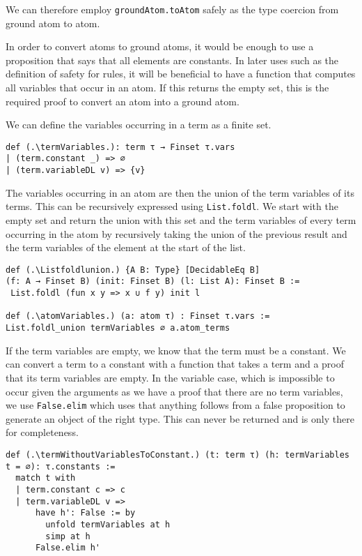 We can therefore employ \lstinline|groundAtom.toAtom| safely as the type coercion from ground atom to atom.

In order to convert atoms to ground atoms, it would be enough to use a proposition that says that all elements are constants. In later uses such as the definition of safety for rules, it will be beneficial to have a function that computes all variables that occur in an atom. If this returns the empty set, this is the required proof to convert an atom into a ground atom. 

We can define the variables occurring in a term as a finite set.

\begin{lstlisting}
def (.\termVariables.): term τ → Finset τ.vars
| (term.constant _) => ∅
| (term.variableDL v) => {v}
\end{lstlisting}

The variables occurring in an atom are then the union of the term variables of its terms. This can be recursively expressed using \lstinline|List.foldl|. We start with the empty set and return the union with this set and the term variables of every term occurring in the atom by recursively taking the union of the previous result and the term variables of the element at the start of the list.

\begin{lstlisting}
def (.\Listfoldlunion.) {A B: Type} [DecidableEq B]  
(f: A → Finset B) (init: Finset B) (l: List A): Finset B :=
 List.foldl (fun x y => x ∪ f y) init l

def (.\atomVariables.) (a: atom τ) : Finset τ.vars := 
List.foldl_union termVariables ∅ a.atom_terms
\end{lstlisting}

If the term variables are empty, we know that the term must be a constant. We can convert a term to a constant with a function that takes a term and a proof that its term variables are empty. In the variable case, which is impossible to occur given the arguments as we have a proof that there are no term variables, we use \lstinline|False.elim| which uses that anything follows from a false proposition to generate an object of the right type. This can never be returned and is only there for completeness.

\begin{lstlisting}
def (.\termWithoutVariablesToConstant.) (t: term τ) (h: termVariables t = ∅): τ.constants :=
  match t with
  | term.constant c => c
  | term.variableDL v =>
      have h': False := by
        unfold termVariables at h
        simp at h
      False.elim h'
\end{lstlisting}

